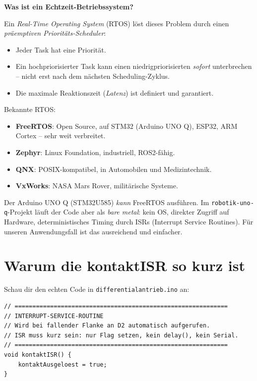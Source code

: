 \begin{haubeBox}
\textbf{Was ist ein Echtzeit-Betriebssystem?}

Ein \textit{Real-Time Operating System} (RTOS) löst dieses
Problem durch einen \textit{präemptiven Prioritäts-Scheduler}:

\begin{itemize}
  \item Jeder Task hat eine Priorität.
  \item Ein hochpriorisierter Task kann einen niedrigpriorisierten
        \emph{sofort} unterbrechen -- nicht erst nach dem nächsten
        Scheduling-Zyklus.
  \item Die maximale Reaktionszeit (\textit{Latenz}) ist definiert
        und garantiert.
\end{itemize}

Bekannte RTOS:
\begin{itemize}
  \item \textbf{FreeRTOS}: Open Source, auf STM32 (Arduino UNO Q),
        ESP32, ARM Cortex -- sehr weit verbreitet.
  \item \textbf{Zephyr}: Linux Foundation, industriell, ROS2-fähig.
  \item \textbf{QNX}: POSIX-kompatibel, in Automobilen und Medizintechnik.
  \item \textbf{VxWorks}: NASA Mars Rover, militärische Systeme.
\end{itemize}

Der Arduino UNO Q (STM32U585) \emph{kann} FreeRTOS ausführen.
Im \texttt{robotik-uno-q}-Projekt läuft der Code aber als
\emph{bare metal}: kein OS, direkter Zugriff auf Hardware,
deterministisches Timing durch ISRs (Interrupt Service Routines).
Für unseren Anwendungsfall ist das ausreichend und einfacher.
\end{haubeBox}

\section{Warum die kontaktISR so kurz ist}

Schau dir den echten Code in \texttt{differentialantrieb.ino} an:

\begin{lstlisting}[style=text]
// ============================================================
// INTERRUPT-SERVICE-ROUTINE
// Wird bei fallender Flanke an D2 automatisch aufgerufen.
// ISR muss kurz sein: nur Flag setzen, kein delay(), kein Serial.
// ============================================================
void kontaktISR() {
    kontaktAusgeloest = true;
}
\end{lstlisting}

